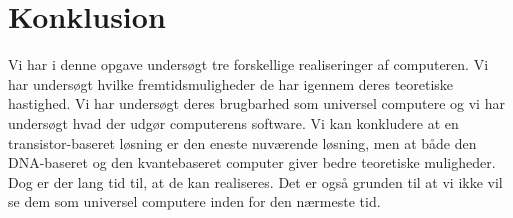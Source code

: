 \section{Konklusion}

Vi har i denne opgave undersøgt tre forskellige realiseringer af computeren. Vi har undersøgt hvilke fremtidsmuligheder de har igennem deres teoretiske hastighed. Vi har undersøgt deres brugbarhed som universel computere og vi har undersøgt hvad der udgør computerens software. Vi kan konkludere at en transistor-baseret løsning er den eneste nuværende løsning, men at både den DNA-baseret og den kvantebaseret computer giver bedre teoretiske muligheder. Dog er der lang tid til, at de kan realiseres. Det er også grunden til at vi ikke vil se dem som universel computere inden for den nærmeste tid. 